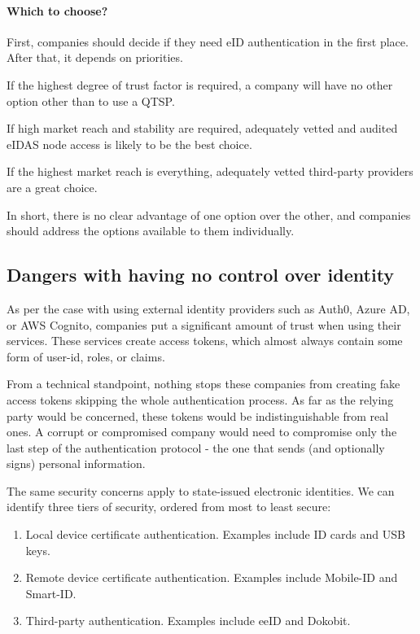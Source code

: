 \paragraph{Which to choose?} First, companies should decide if they need eID authentication in the first place. After that, it depends on priorities.

If the highest degree of trust factor is required, a company will have no other option other than to use a QTSP.

If high market reach and stability are required, adequately vetted and audited eIDAS node access is likely to be the best choice.

If the highest market reach is everything, adequately vetted third-party providers are a great choice.

In short, there is no clear advantage of one option over the other, and companies should address the options available to them individually.


\subsection{Dangers with having no control over identity}

As per the case with using external identity providers such as Auth0, Azure AD, or AWS Cognito, companies put a significant amount of trust when using their services. These services create access tokens, which almost always contain some form of user-id, roles, or claims.

From a technical standpoint, nothing stops these companies from creating fake access tokens skipping the whole authentication process. As far as the relying party would be concerned, these tokens would be indistinguishable from real ones. A corrupt or compromised company would need to compromise only the last step of the authentication protocol - the one that sends (and optionally signs) personal information.

The same security concerns apply to state-issued electronic identities. We can identify three tiers of security, ordered from most to least secure:

\begin{enumerate}
    \item Local device certificate authentication. Examples include ID cards and USB keys.
    \item Remote device certificate authentication. Examples include Mobile-ID and Smart-ID.
    \item Third-party authentication. Examples include eeID and Dokobit.
\end{enumerate}


